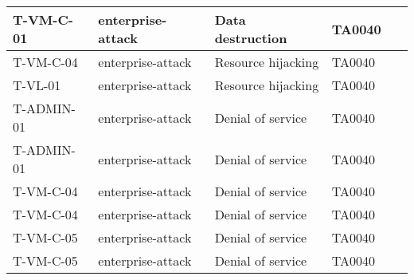 \begin{table}[!ht]
\begin{tabular}{|l|l|l|l|l|}
        T-VM-C-01 & enterprise-attack & Data destruction & TA0040 & ~ \\ \hline
        T-VM-C-04 & enterprise-attack & Resource hijacking & TA0040 & ~ \\ \hline
        T-VL-01 & enterprise-attack & Resource hijacking & TA0040 & ~ \\ \hline
        T-ADMIN-01 & enterprise-attack & Denial of service & TA0040 & ~ \\ \hline
        T-ADMIN-01 & enterprise-attack & Denial of service & TA0040 & ~ \\ \hline
        T-VM-C-04 & enterprise-attack & Denial of service & TA0040 & ~ \\ \hline
        T-VM-C-04 & enterprise-attack & Denial of service & TA0040 & ~ \\ \hline
        T-VM-C-05 & enterprise-attack & Denial of service & TA0040 & ~ \\ \hline
        T-VM-C-05 & enterprise-attack & Denial of service & TA0040 & ~ \\ \hline
    \end{tabular}
\end{table}


